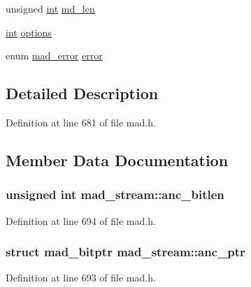\begin{DoxyCompactItemize}
\item 
unsigned \hyperlink{xmltok_8h_a5a0d4a5641ce434f1d23533f2b2e6653}{int} \hyperlink{structmad__stream_a06e0426b821403e0d6f18482793d556e}{md\+\_\+len}
\item 
\hyperlink{xmltok_8h_a5a0d4a5641ce434f1d23533f2b2e6653}{int} \hyperlink{structmad__stream_a870d5724cee7de5af658c92dfcb48236}{options}
\item 
enum \hyperlink{lib-src_2libmad_2msvc_09_09_2mad_8h_a03f249e372a63a329b780307f4e2c2df}{mad\+\_\+error} \hyperlink{structmad__stream_ac9a8e6b43a422325e581d73d28bb538a}{error}
\end{DoxyCompactItemize}


\subsection{Detailed Description}


Definition at line 681 of file mad.\+h.



\subsection{Member Data Documentation}
\subsubsection[{\texorpdfstring{anc\+\_\+bitlen}{anc_bitlen}}]{\setlength{\rightskip}{0pt plus 5cm}unsigned {\bf int} mad\+\_\+stream\+::anc\+\_\+bitlen}\hypertarget{structmad__stream_a9c0f59e34e285be5ef1d188c87f99fe6}{}\label{structmad__stream_a9c0f59e34e285be5ef1d188c87f99fe6}


Definition at line 694 of file mad.\+h.

\subsubsection[{\texorpdfstring{anc\+\_\+ptr}{anc_ptr}}]{\setlength{\rightskip}{0pt plus 5cm}struct {\bf mad\+\_\+bitptr} mad\+\_\+stream\+::anc\+\_\+ptr}\hypertarget{structmad__stream_ae9e60e90ae0ada3e6b86f323da60b8e9}{}\label{structmad__stream_ae9e60e90ae0ada3e6b86f323da60b8e9}


Definition at line 693 of file mad.\+h.

